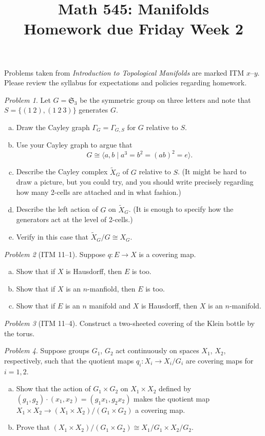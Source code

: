 \documentclass[11pt,twoside]{amsart}
\title{Math 545: Manifolds\\ Homework due Friday Week 2}
\theoremstyle{plain}
\theoremstyle{remark}
\newtheorem{prob}{Problem}
\theoremstyle{definition}
\theoremstyle{definition}
\begin{document}
\maketitle

\noindent Problems taken from \emph{Introduction to Topological Manifolds} are marked ITM $x$--$y$. Please review the syllabus for expectations and policies regarding homework.

\begin{prob}
Let $G = \mathfrak S_3$ be the symmetric group on three letters and note that $S = \{(1~2),(1~2~3)\}$ generates $G$.
\begin{enumerate}[(a)]
\item Draw the Cayley graph $\Gamma_G = \Gamma_{G,S}$ for $G$ relative to $S$.
\item Use your Cayley graph to argue that
\[
  G\cong \langle a,b\mid a^3=b^2=(ab)^2=e\rangle.
\]
\item Describe the Cayley complex $\tilde X_G$ of $G$ relative to $S$. (It might be hard to draw a picture, but you could try, and you should write precisely regarding how many 2-cells are attached and in what fashion.)
\item Describe the left action of $G$ on $\tilde X_G$. (It is enough to specify how the generators act at the level of 2-cells.)
\item Verify in this case that $\tilde X_G/G\cong X_G$.
\end{enumerate}
\end{prob}

\begin{prob}[ITM 11--1]
Suppose $q\colon E\to X$ is a covering map.
\begin{enumerate}[(a)]
\item Show that if $X$ is Hausdorff, then $E$ is too.
\item Show that if $X$ is an $n$-manfiold, then $E$ is too.
\item Show that if $E$ is an $n$ manifold and $X$ is Hausdorff, then $X$ is an $n$-manifold.
\end{enumerate}
\end{prob}

\begin{prob}[ITM 11--4]
Construct a two-sheeted covering of the Klein bottle by the torus.
\end{prob}

\begin{prob}
Suppose groups $G_1$, $G_2$ act continuously on spaces $X_1$, $X_2$, respectively, such that the quotient maps $q_i\colon X_i\to X_i/G_i$ are covering maps for $i=1,2$. 
\begin{enumerate}[(a)]
\item Show that the action of $G_1\times G_2$ on $X_1\times X_2$ defined by $(g_1,g_2)\cdot (x_1,x_2) = (g_1x_1,g_2x_2)$ makes the quotient map $X_1\times X_2\to (X_1\times X_2)/(G_1\times G_2)$ a covering map.
\item Prove that $(X_1\times X_2)/(G_1\times G_2)\cong X_1/G_1\times X_2/G_2$.
\end{enumerate}
\end{prob}
\end{document}
